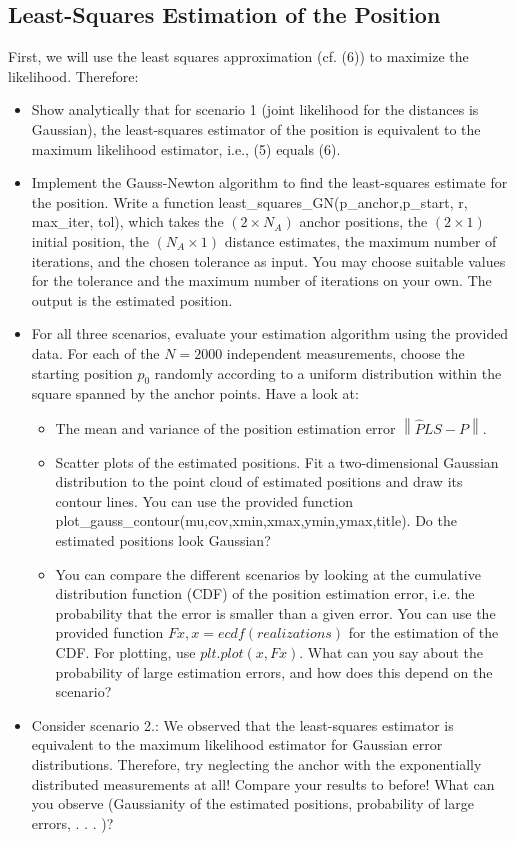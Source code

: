 \documentclass[a4paper]{article}
\newcommand\norm[1]{\left\lVert#1\right\rVert}
\begin{document}
\subsection{Least-Squares Estimation of the Position}
First, we will use the least squares approximation (cf. (6)) to maximize the likelihood. Therefore:

\begin{itemize}
\item Show analytically that for scenario 1 (joint likelihood for the distances is Gaussian), the least-squares estimator of the position is equivalent to the maximum likelihood estimator, i.e., (5) equals (6).
\item Implement the Gauss-Newton algorithm to find the least-squares estimate for the position. Write a function least\_squares\_GN(p\_anchor,p\_start, r, max\_iter, tol), which takes the $(2 × N_A)$ anchor positions, the $(2 × 1)$ initial position, the $(N_A × 1)$ distance estimates, the maximum number of iterations, and the chosen tolerance as input. You may choose suitable values for the tolerance and the maximum number of iterations on your own. The output is the estimated position. 
\item For all three scenarios, evaluate your estimation algorithm using the provided data. For each of the $N = 2000$ independent measurements, choose the starting position $p_0$ randomly according to a uniform distribution within the square spanned by the anchor points.\newline
Have a look at:

\begin{itemize}
  \item The mean and variance of the position estimation error $\norm{\hat{P}LS -P}$.
  \item Scatter plots of the estimated positions. Fit a two-dimensional Gaussian distribution to the point cloud of estimated positions and draw its contour lines. You can use the provided function plot\_gauss\_contour(mu,cov,xmin,xmax,ymin,ymax,title). Do the estimated positions look Gaussian?
  \item You can compare the different scenarios by looking at the cumulative distribution function (CDF) of the position estimation error, i.e. the probability that the error is smaller than a given error. You can use the provided function $Fx,x = ecdf(realizations)$ for the estimation of the CDF. For plotting, use $plt.plot(x,Fx)$. What can you say about the probability of large estimation errors, and how does this depend on the scenario?

\end{itemize}

\item Consider scenario 2.: We observed that the least-squares estimator is equivalent to the maximum likelihood estimator for Gaussian error distributions. Therefore, try neglecting the anchor with the exponentially distributed measurements at all! Compare your results to before! What can you observe (Gaussianity of the estimated positions, probability of large errors, . . . )?

\end{itemize}
\end{document}
